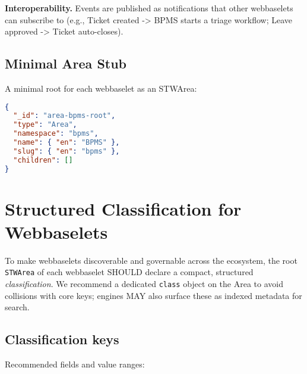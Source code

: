 \textbf{Interoperability.} Events are published as notifications that other webbaselets can subscribe to (e.g., Ticket created -> BPMS starts a triage workflow; Leave approved -> Ticket auto-closes).

\subsection{Minimal Area Stub}
A minimal root for each webbaselet as an STWArea:
\begin{lstlisting}[language=JSON,caption={Minimal Webbaselet Root (Area)}]
{
  "_id": "area-bpms-root",
  "type": "Area",
  "namespace": "bpms",
  "name": { "en": "BPMS" },
  "slug": { "en": "bpms" },
  "children": []
}
\end{lstlisting}

\section{Structured Classification for Webbaselets}
\label{sec:app-webbaselets-classification}

To make webbaselets discoverable and governable across the ecosystem, the root \texttt{STWArea} of each webbaselet SHOULD declare a compact, structured \emph{classification}. We recommend a dedicated \texttt{class} object on the Area to avoid collisions with core keys; engines MAY also surface these as indexed metadata for search.

\subsection{Classification keys}
Recommended fields and value ranges:

